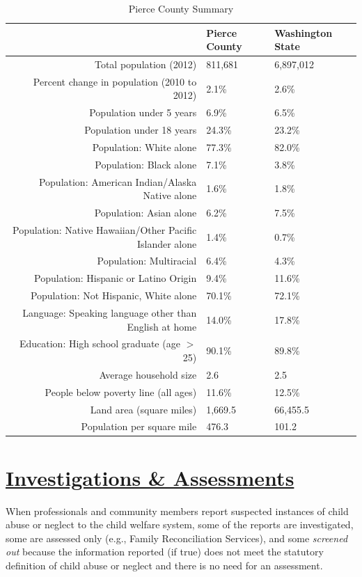 \documentclass{article}\usepackage{graphicx, color}
\begin{document}
\begin{table}[ht]
\centering
\begin{tabular}{rll}
  \toprule
 & Pierce County & Washington State \\ 
  \midrule
Total population (2012) & 811,681 & 6,897,012 \\ 
  Percent change in population (2010 to 2012) & 2.1\% & 2.6\% \\ 
  Population under 5 years & 6.9\% & 6.5\% \\ 
  Population under 18 years & 24.3\% & 23.2\% \\ 
  Population: White alone & 77.3\% & 82.0\% \\ 
  Population: Black alone & 7.1\% & 3.8\% \\ 
  Population: American Indian/Alaska Native alone & 1.6\% & 1.8\% \\ 
  Population: Asian alone & 6.2\% & 7.5\% \\ 
  Population: Native Hawaiian/Other Pacific Islander alone & 1.4\% & 0.7\% \\ 
  Population: Multiracial & 6.4\% & 4.3\% \\ 
  Population: Hispanic or Latino Origin & 9.4\% & 11.6\% \\ 
  Population: Not Hispanic, White alone & 70.1\% & 72.1\% \\ 
  Language: Speaking language other than English at home & 14.0\% & 17.8\% \\ 
  Education: High school graduate (age $>$25) & 90.1\% & 89.8\% \\ 
  Average household size & 2.6 & 2.5 \\ 
  People below poverty line (all ages) & 11.6\% & 12.5\% \\ 
  Land area (square miles) & 1,669.5 & 66,455.5 \\ 
  Population per square mile & 476.3 & 101.2 \\ 
   \bottomrule
\end{tabular}
\caption{Pierce County Summary} 
\end{table}



\section{\href{http://www.partnersforourchildren.org//child-well-being/visualizations/investigations-assessments/trends}
{Investigations \& Assessments}}
When professionals and community members report suspected instances of child abuse or neglect to the child welfare system, some of the reports are investigated, some are assessed only (e.g., Family Reconciliation Services), and some \emph{screened out} because the information reported (if true) does not meet the statutory definition of child abuse or neglect and there is no need for an assessment.
\end{document}
